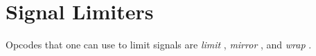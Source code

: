 \begin{comment}
\documentclass[10pt]{article}
\usepackage{fullpage, graphicx, url}
\setlength{\parskip}{1ex}
\setlength{\parindent}{0ex}
\title{Signal Limiters}



\begin{tabular}{ccc}
The Alternative Csound Reference Manual & & \\
Previous &Signal Modifiers &Next

\end{tabular}

\end{comment}
\section{Signal Limiters}


  Opcodes that one can use to limit signals are \emph{limit}
, \emph{mirror}
, and \emph{wrap}
. 


\begin{comment}
\begin{tabular}{lcr}
Previous &Home &Next \\
Sample Level Operators &Up &Special Effects

\end{tabular}



\end{comment}
